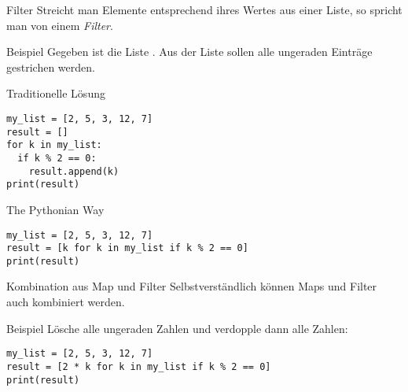 \begin{frame}
\begin{block}{Filter}
\vspace{2pt}
Streicht man Elemente entsprechend ihres Wertes aus einer Liste, so spricht man von einem \emph{Filter}. 
\end{block}

\pause 

\vspace{12pt}

\begin{exampleblock}{Beispiel}
\vspace{2pt}
Gegeben ist die Liste . Aus der Liste sollen alle ungeraden Einträge gestrichen werden. 
\end{exampleblock}

\end{frame}

\begin{fragile}
\begin{overprint}

\begin{block}{Traditionelle Lösung}
\vspace{2pt}
\begin{verbatim}
my_list = [2, 5, 3, 12, 7]
result = []
for k in my_list: 
  if k % 2 == 0: 
    result.append(k)
print(result)
\end{verbatim}
\end{block}

\vspace{12pt}

\pause

\begin{block}{The Pythonian Way}
\vspace{2pt}
\begin{verbatim}
my_list = [2, 5, 3, 12, 7]
result = [k for k in my_list if k % 2 == 0]
print(result)
\end{verbatim}
\end{block}
\end{overprint}


\end{fragile}

\begin{fragile}
\begin{block}{Kombination aus Map und Filter}
\vspace{2pt}
Selbstverständlich können Maps und Filter auch kombiniert werden. 
\end{block}

\vspace{12pt}

\begin{exampleblock}{Beispiel}
\vspace{2pt}
Lösche alle ungeraden Zahlen und verdopple dann alle Zahlen: 

\begin{verbatim}
my_list = [2, 5, 3, 12, 7]
result = [2 * k for k in my_list if k % 2 == 0]
print(result)
\end{verbatim}
\end{exampleblock}

\end{fragile}


